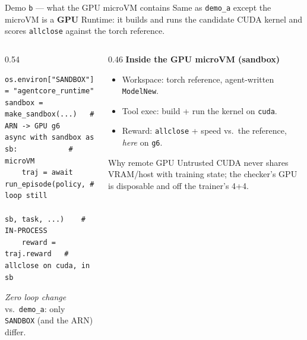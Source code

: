 \documentclass[aspectratio=169]{beamer}
\begin{document}
\begin{frame}[fragile]{Demo \texttt{b} --- what the GPU microVM contains}
  \footnotesize Same as \texttt{demo\_a} except the microVM is a \textbf{GPU} Runtime: it builds and runs
  the candidate CUDA kernel and scores \texttt{allclose} against the torch reference.
  \begin{columns}[T]
    \begin{column}{0.54\textwidth}
{\scriptsize
\begin{verbatim}
os.environ["SANDBOX"] = "agentcore_runtime"
sandbox = make_sandbox(...)   # ARN -> GPU g6
async with sandbox as sb:            # microVM
    traj = await run_episode(policy, # loop still
                   sb, task, ...)    # IN-PROCESS
    reward = traj.reward   # allclose on cuda, in sb
\end{verbatim}}
      \scriptsize \emph{Zero loop change} vs.\ \texttt{demo\_a}: only \texttt{SANDBOX} (and the ARN) differ.
    \end{column}
    \begin{column}{0.46\textwidth}
      \footnotesize\textbf{Inside the GPU microVM (sandbox)}
      \begin{itemize}\setlength\itemsep{0.08em}
        \item Workspace: torch reference, agent-written \texttt{ModelNew}.
        \item Tool exec: build + run the kernel on \texttt{cuda}.
        \item Reward: \texttt{allclose} + speed vs.\ the reference, \emph{here} on \texttt{g6}.
      \end{itemize}
      \begin{block}{Why remote GPU}
        \scriptsize Untrusted CUDA never shares VRAM/host with training state; the checker's GPU is
        disposable and off the trainer's 4+4.
      \end{block}
    \end{column}
  \end{columns}
\end{frame}
\end{document}
